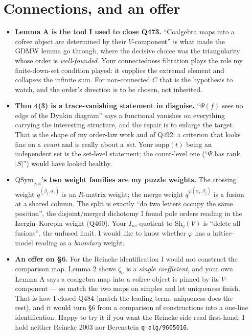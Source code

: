 \documentclass[11pt,a4paper]{article}
\newcommand{\QS}{\mathrm{QSym}}
\begin{document}
\section{Connections, and an offer}
\begin{itemize}
\item \textbf{Lemma A is the tool I used to close Q473.} ``Coalgebra maps into a cofree object are
determined by their $V$-component'' is what made the GDMW lemma go through, where the decisive
choice was the triangularity whose order is \emph{well-founded}. Your connectedness filtration
plays the role my finite-down-set condition played: it supplies the extremal element and collapses
the infinite sum. For non-connected $C$ that is the hypothesis to watch, and the order's direction
is to be chosen, not inherited.
\item \textbf{Thm 4(3) is a trace-vanishing statement in disguise.} ``$\Psi(f)$ sees no edge of the
Dynkin diagram'' says a functional vanishes on everything carrying the interesting structure, and
the repair is to enlarge the target. That is the shape of my order-law work and of Q492: a
criterion that looks fine on a \emph{count} and is really about a \emph{set}. Your $\mathrm{supp}(t)$
being an independent set is the set-level statement; the count-level one (``$\Psi$ has rank $|S|$'')
would have looked healthy.
\item \textbf{$\QS_{q,\varphi}$'s two weight families are my puzzle weights.} The crossing weight
$q^{(\beta_j,\alpha_i)}$ is an $R$-matrix weight; the merge weight $q^{\varphi(\alpha_i,\beta_j)}$
is a fusion at a shared column. The split is exactly ``do two letters occupy the same position'',
the disjoint/merged dichotomy I found pole orders reading in the Izergin--Korepin weight (Q460).
Your $I_{ns}$-quotient to $\mathrm{Sh}_q(V)$ is ``delete all fusions'', the unfused limit. I would
like to know whether $\varphi$ has a lattice-model reading as a \emph{boundary} weight.
\item \textbf{An offer on \S6.} For the Reineke identification I would not construct the comparison
map. Lemma 2 shows $\zeta_o$ is a \emph{single coefficient}, and your own Lemma A says a coalgebra
map into a cofree object is pinned by its $V$-component --- so match the two maps on simples and let
uniqueness finish. That is how I closed Q484 (match the leading term; uniqueness does the rest), and
it would turn \S6 from a comparison of constructions into a one-line identification. Happy to try it
if you want the Reineke side read first-hand; I hold neither Reineke 2003 nor Berenstein
\texttt{q-alg/9605016}.
\end{itemize}
\end{document}
